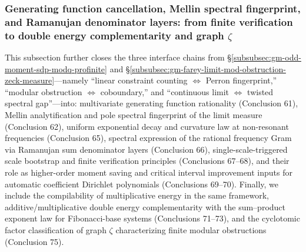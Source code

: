 \subsubsection{Generating function cancellation, Mellin spectral fingerprint, and Ramanujan denominator layers: from finite verification to double energy complementarity and graph \texorpdfstring{$\zeta$}{zeta}}\label{subsubsec:gm-genfunc-mellin-ramanujan-bootstrap-sumproduct-graphzeta}
This subsection further closes the three interface chains from \S\ref{subsubsec:gm-odd-moment-sdp-modq-profinite} and \S\ref{subsubsec:gm-farey-limit-mod-obstruction-zeck-measure}---namely ``linear constraint counting \(\Leftrightarrow\) Perron fingerprint,'' ``modular obstruction \(\Leftrightarrow\) coboundary,'' and ``continuous limit \(\Leftrightarrow\) twisted spectral gap''---into: multivariate generating function rationality (Conclusion 61), Mellin analytification and pole spectral fingerprint of the limit measure (Conclusion 62), uniform exponential decay and curvature law at non-resonant frequencies (Conclusion 65), spectral expression of the rational frequency Gram via Ramanujan sum denominator layers (Conclusion 66), single-scale-triggered scale bootstrap and finite verification principles (Conclusions 67--68), and their role as higher-order moment saving and critical interval improvement inputs for automatic coefficient Dirichlet polynomials (Conclusions 69--70). Finally, we include the compilability of multiplicative energy in the same framework, additive/multiplicative double energy complementarity with the sum--product exponent law for Fibonacci-base systems (Conclusions 71--73), and the cyclotomic factor classification of graph \(\zeta\) characterizing finite modular obstructions (Conclusion 75).


